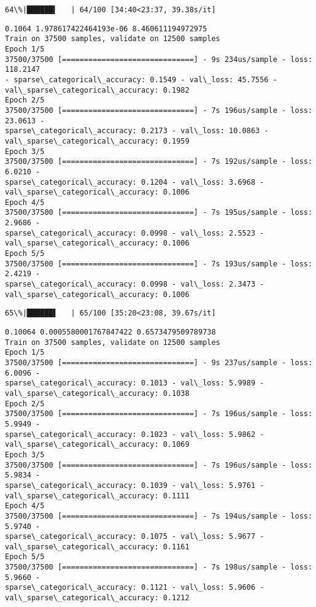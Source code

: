 \documentclass[11pt]{article}
\begin{document}
    \begin{Verbatim}[commandchars=\\\{\}]
 64\%|██████▍   | 64/100 [34:40<23:37, 39.38s/it]
    \end{Verbatim}

    \begin{Verbatim}[commandchars=\\\{\}]
0.1064 1.978617422464193e-06 8.460611194972975
Train on 37500 samples, validate on 12500 samples
Epoch 1/5
37500/37500 [==============================] - 9s 234us/sample - loss: 118.2147
- sparse\_categorical\_accuracy: 0.1549 - val\_loss: 45.7556 -
val\_sparse\_categorical\_accuracy: 0.1982
Epoch 2/5
37500/37500 [==============================] - 7s 196us/sample - loss: 23.0613 -
sparse\_categorical\_accuracy: 0.2173 - val\_loss: 10.0863 -
val\_sparse\_categorical\_accuracy: 0.1959
Epoch 3/5
37500/37500 [==============================] - 7s 192us/sample - loss: 6.0210 -
sparse\_categorical\_accuracy: 0.1204 - val\_loss: 3.6968 -
val\_sparse\_categorical\_accuracy: 0.1006
Epoch 4/5
37500/37500 [==============================] - 7s 195us/sample - loss: 2.9686 -
sparse\_categorical\_accuracy: 0.0998 - val\_loss: 2.5523 -
val\_sparse\_categorical\_accuracy: 0.1006
Epoch 5/5
37500/37500 [==============================] - 7s 193us/sample - loss: 2.4219 -
sparse\_categorical\_accuracy: 0.0998 - val\_loss: 2.3473 -
val\_sparse\_categorical\_accuracy: 0.1006
    \end{Verbatim}

    \begin{Verbatim}[commandchars=\\\{\}]
 65\%|██████▌   | 65/100 [35:20<23:08, 39.67s/it]
    \end{Verbatim}

    \begin{Verbatim}[commandchars=\\\{\}]
0.10064 0.0005580001767847422 0.6573479509789738
Train on 37500 samples, validate on 12500 samples
Epoch 1/5
37500/37500 [==============================] - 9s 237us/sample - loss: 6.0096 -
sparse\_categorical\_accuracy: 0.1013 - val\_loss: 5.9989 -
val\_sparse\_categorical\_accuracy: 0.1038
Epoch 2/5
37500/37500 [==============================] - 7s 196us/sample - loss: 5.9949 -
sparse\_categorical\_accuracy: 0.1023 - val\_loss: 5.9862 -
val\_sparse\_categorical\_accuracy: 0.1069
Epoch 3/5
37500/37500 [==============================] - 7s 196us/sample - loss: 5.9834 -
sparse\_categorical\_accuracy: 0.1039 - val\_loss: 5.9761 -
val\_sparse\_categorical\_accuracy: 0.1111
Epoch 4/5
37500/37500 [==============================] - 7s 194us/sample - loss: 5.9740 -
sparse\_categorical\_accuracy: 0.1075 - val\_loss: 5.9677 -
val\_sparse\_categorical\_accuracy: 0.1161
Epoch 5/5
37500/37500 [==============================] - 7s 198us/sample - loss: 5.9660 -
sparse\_categorical\_accuracy: 0.1121 - val\_loss: 5.9606 -
val\_sparse\_categorical\_accuracy: 0.1212
    \end{Verbatim}
\end{document}
